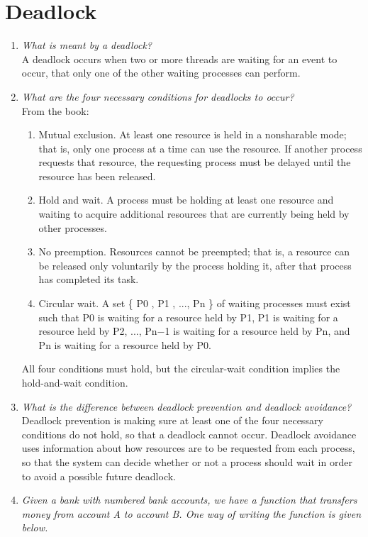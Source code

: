\documentclass[a4paper]{article}
\begin{document}
\section{Deadlock}
\begin{enumerate}

  \item \textit{ What is meant by a deadlock? }\\

    A deadlock occurs when two or more threads are waiting for an event to occur, that only one of the other waiting processes can perform.

  \item \textit{ What are the four necessary conditions for deadlocks to occur? }\\

    From the book: \\
    \begin{enumerate}
      \item Mutual exclusion. At least one resource is held in a nonsharable mode; that is, only one process at a time can use the resource. If another process requests that resource, the requesting process must be delayed until the resource has been released.
      \item Hold and wait. A process must be holding at least one resource and waiting to acquire additional resources that are currently being held by other processes.
      \item No preemption. Resources cannot be preempted; that is, a resource can be released only voluntarily by the process holding it, after that process has completed its task.
      \item Circular wait. A set \{ P0 , P1 , ..., Pn \} of waiting processes must exist such that P0 is waiting for a resource held by P1, P1 is waiting for a resource held by P2, ..., Pn−1 is waiting for a resource held by Pn, and Pn is waiting for a resource held by P0.
    \end{enumerate}
    All four conditions must hold, but the circular-wait condition implies the hold-and-wait condition.
  \item  \textit{What is the difference between deadlock prevention and deadlock avoidance? }\\

    Deadlock prevention is making sure at least one of the four necessary conditions do not hold, so that a deadlock cannot occur. Deadlock avoidance uses information about how resources are to be requested from each process, so that the system can decide whether or not a process should wait in order to avoid a possible future deadlock. 
  \item \textit{ Given a bank with numbered bank accounts, we have a function that transfers money from account A to account B. One way of writing the function is given below.} \\


\end{enumerate}
\end{document}
